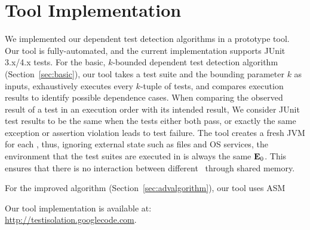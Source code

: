 \section{Tool Implementation}
\label{sec:impl}


We implemented our dependent test detection algorithms in
a prototype tool. Our tool is fully-automated, and the
current implementation supports JUnit 3.x/4.x tests.
For the basic, $k$-bounded dependent test detection algorithm
(Section~\ref{sec:basic}), our tool takes a test suite
and the bounding parameter $k$ as inputs, 
exhaustively executes every $k$-tuple
of tests, and compares execution results to identify possible dependence cases. When
comparing the observed result of a test in an execution order with
its intended result,
We consider JUnit test results to be the same when the tests either
both pass, or exactly the same exception or assertion violation leads
to test failure.
The tool creates a fresh JVM for each \testlist, thus, ignoring
external state such as files and OS services, the environment
that the test suites are executed in is always the same $\mathbf{E}_0$.
This ensures that there is no interaction between
different \testlist\ through shared memory.

For the improved algorithm (Section~\ref{sec:advalgorithm}),
our tool uses ASM 


Our tool implementation is available at: \\\url{http://testisolation.googlecode.com}.








